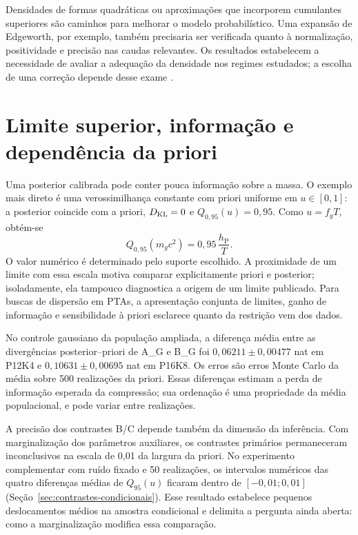 Densidades de formas quadráticas ou aproximações que incorporem cumulantes superiores são caminhos para melhorar o modelo probabilístico. Uma expansão de Edgeworth, por exemplo, também precisaria ser verificada quanto à normalização, positividade e precisão nas caudas relevantes. Os resultados estabelecem a necessidade de avaliar a adequação da densidade nos regimes estudados; a escolha de uma correção depende desse exame \autocite{franciolini2025}.

\section{Limite superior, informação e dependência da priori}

Uma posterior calibrada pode conter pouca informação sobre a massa. O exemplo mais direto é uma verossimilhança constante com priori uniforme em $u\in[0,1]$: a posterior coincide com a priori, $D_{\rm KL}=0$ e $Q_{0,95}(u)=0,95$. Como $u=f_gT$, obtém-se
\begin{equation}
 Q_{0,95}(m_gc^2)=0,95\,\frac{h_{\mathrm P}}{T}.
 \label{eq:discussao-priori}
\end{equation}
O valor numérico é determinado pelo suporte escolhido. A proximidade de um limite com essa escala motiva comparar explicitamente priori e posterior; isoladamente, ela tampouco diagnostica a origem de um limite publicado. Para buscas de dispersão em PTAs, a apresentação conjunta de limites, ganho de informação e sensibilidade à priori esclarece quanto da restrição vem dos dados.

No controle gaussiano da população ampliada, a diferença média entre as divergências posterior--priori de A\_G e B\_G foi $0,06211\pm0,00477$ nat em P12K4 e $0,10631\pm0,00695$ nat em P16K8. Os erros são erros Monte Carlo da média sobre 500 realizações da priori. Essas diferenças estimam a perda de informação esperada da compressão; sua ordenação é uma propriedade da média populacional, e pode variar entre realizações.

A precisão dos contrastes B/C depende também da dimensão da inferência. Com marginalização dos parâmetros auxiliares, os contrastes primários permaneceram inconclusivos na escala de 0,01 da largura da priori. No experimento complementar com ruído fixado e 50 realizações, os intervalos numéricos das quatro diferenças médias de $Q_{95}(u)$ ficaram dentro de $[-0{,}01;0{,}01]$ (Seção~\ref{sec:contrastes-condicionais}). Esse resultado estabelece pequenos deslocamentos médios na amostra condicional e delimita a pergunta ainda aberta: como a marginalização modifica essa comparação.


